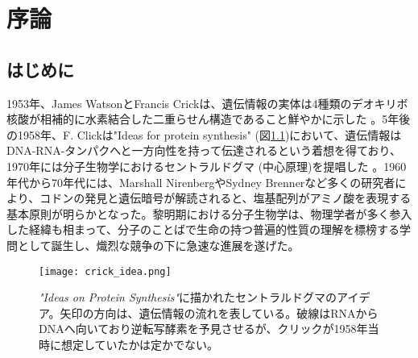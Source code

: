 \chapter{序論}
\section{はじめに}
1953年、James WatsonとFrancis Crickは、遺伝情報の実体は4種類のデオキリボ核酸が相補的に水素結合した二重らせん構造であること鮮やかに示した \citep{watson1953molecular}。5年後の1958年、F. Clickは"Ideas for protein synthesis"  (図\ref{fig:crick_idea})において、遺伝情報はDNA-RNA-タンパクへと一方向性を持って伝達されるという着想を得ており、1970年には分子生物学におけるセントラルドグマ (中心原理)を提唱した \citep{crick1970central}。1960年代から70年代には、Marshall NirenbergやSydney Brennerなど多くの研究者により、コドンの発見と遺伝暗号が解読されると、塩基配列がアミノ酸を表現する基本原則が明らかとなった。黎明期における分子生物学は、物理学者が多く参入した経緯も相まって、分子のことばで生命の持つ普遍的性質の理解を標榜する学問として誕生し、熾烈な競争の下に急速な進展を遂げた。

\begin{figure}[!h]
	\begin{center}
		\texttt{[image: crick\_idea.png]}
	\end{center}
	\caption{\small{\textit{"Ideas on Protein Synthesis"}に描かれたセントラルドグマのアイデア。矢印の方向は、遺伝情報の流れを表している。破線はRNAからDNAへ向いており逆転写酵素を予見させるが、クリックが1958年当時に想定していたかは定かでない。}}
	\label{fig:crick_idea}
\end{figure}


